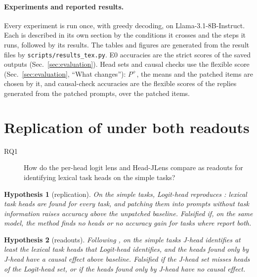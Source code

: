 \documentclass[11pt,a4paper]{article}
\newtheorem{hypothesis}{Hypothesis}
\begin{document}
\paragraph{Experiments and reported results.} Every experiment is run once, with greedy decoding, on Llama-3.1-8B-Instruct. Each is described in its own section by the conditions it crosses and the steps it runs, followed by its results. The tables and figures are generated from the result files by \texttt{scripts/results\_tex.py}. E0 accuracies are the strict scores of the saved outputs (Sec.~\ref{sec:evaluation}). Head sets and causal checks use the flexible score (Sec.~\ref{sec:evaluation}, ``What changes''): $P^{+}$, the means and the patched items are chosen by it, and causal-check accuracies are the flexible scores of the replies generated from the patched prompts, over the patched items.

\section{Replication of \citet{yang2026shared} under both readouts}\label{sec:replication}

\begin{description}
\item[RQ1] How do the per-head logit lens and Head-JLens compare as readouts for identifying lexical task heads on the simple tasks?
\end{description}

\begin{hypothesis}[replication]\label{h:rep}
On the simple tasks, Logit-head reproduces \citet{yang2026shared}: lexical task heads are found for every task, and patching them into prompts without task information raises accuracy above the unpatched baseline. \emph{Falsified} if, on the same model, the method finds no heads or no accuracy gain for tasks where \citet{yang2026shared} report both.
\end{hypothesis}

\begin{hypothesis}[readouts]\label{h:readout}
Following \citet{merlo2026headjlens}, on the simple tasks J-head identifies at least the lexical task heads that Logit-head identifies, and the heads found only by J-head have a causal effect above baseline. \emph{Falsified} if the J-head set misses heads of the Logit-head set, or if the heads found only by J-head have no causal effect.
\end{hypothesis}
\end{document}
